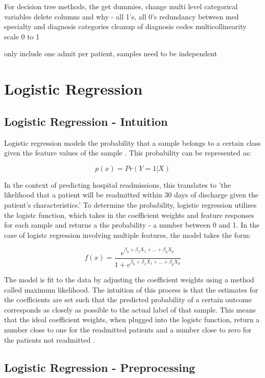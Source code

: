 \documentclass[sigconf]{acmart}
\begin{document}
For decision tree methods, the 
get dummies, change multi level categorical variables
delete columns and why - all 1's, all 0's redundancy between med specialty and diagnosis categories
cleanup of diagnosis codes
multicollinearity
scale 0 to 1

only include one admit per patient, samples need to be independent

\section{Logistic Regression}

\subsection{Logistic Regression - Intuition}

Logistic regression models the probability that a sample belongs to a certain class given the feature values of the sample \cite{cite08}. This probability can be represented as:

\[p(x) = Pr(Y = 1 | X)\]

In the context of predicting hospital readmissions, this translates to 'the likelihood that a patient will be readmitted within 30 days of discharge given the patient's characteristics.' To determine the probability, logistic regression utilizes the logistc function, which takes in the coefficient weights and feature responses for each sample and returns a the probability - a number between 0 and 1\cite{cite08}. In the case of logistc regression involving multiple features, the model takes the form:

\[ f(x) =\frac{e^{\beta_0 + \beta_1X_1 + ... + \beta_pX_p}}{1 + e^{\beta_0 + \beta_1X_1 + ... + \beta_pX_p}}  \]

The model is fit to the data by adjusting the coefficient weights using a method called maximum likelihood. The intuition of this process is that the estimates for the coefficients are set such that the predicted probability of a certain outcome corresponds as closely as possible to the actual label of that sample. This means that the ideal coefficient weights, when plugged into the logistc function, return a number close to one for the readmitted patients and a number close to zero for the patients not readmitted \cite{cite08}.

\subsection{Logistic Regression - Preprocessing}
\end{document}
